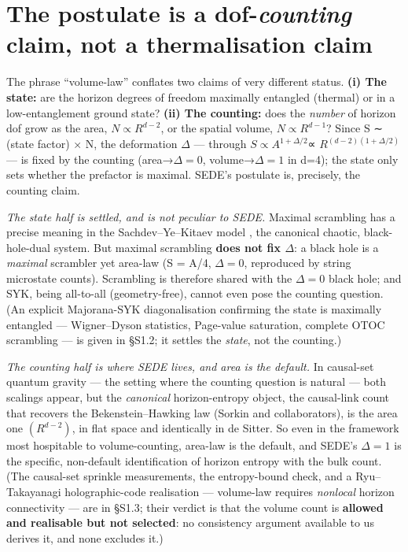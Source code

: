\documentclass[11pt,a4paper]{article}
\begin{document}
\section{\texorpdfstring{The postulate is a dof-\emph{counting} claim,
not a thermalisation
claim}{The postulate is a dof-counting claim, not a thermalisation claim}}\label{sec-2}

The phrase ``volume-law'' conflates two claims of very different status.
\textbf{(i) The state:} are the horizon degrees of freedom maximally
entangled (thermal) or in a low-entanglement ground state? \textbf{(ii)
The counting:} does the \emph{number} of horizon dof grow as the area,
\(N \propto  R^{d-2}\), or the spatial volume, \(N \propto  R^{d-1}\)?
Since S ∼ (state factor) × N, the deformation \(\Delta\) --- through
\(S \propto  A^{1+\Delta /2}\)∝ \(R^{(d-2)(1+\Delta /2)}\) --- is fixed
by the counting (area→\(\Delta =0\), volume→\(\Delta =1\) in d=4); the
state only sets whether the prefactor is maximal. SEDE's postulate is,
precisely, the counting claim.

\emph{The state half is settled, and is not peculiar to SEDE.} Maximal
scrambling has a precise meaning in the Sachdev--Ye--Kitaev model
\citep{Sachdev:1992fk, Kitaev:2015}, the canonical chaotic,
black-hole-dual system. But maximal scrambling \textbf{does not fix
\(\Delta\)}: a black hole is a \emph{maximal} scrambler yet area-law (S
= A/4, \(\Delta =0\), reproduced by string microstate counts).
Scrambling is therefore shared with the \(\Delta =0\) black hole; and
SYK, being all-to-all (geometry-free), cannot even pose the counting
question. (An explicit Majorana-SYK diagonalisation confirming the state
is maximally entangled --- Wigner--Dyson statistics, Page-value
saturation, complete OTOC scrambling --- is given in §S1.2; it settles
the \emph{state}, not the counting.)

\emph{The counting half is where SEDE lives, and area is the default.}
In causal-set quantum gravity --- the setting where the counting
question is natural --- both scalings appear, but the \emph{canonical}
horizon-entropy object, the causal-link count that recovers the
Bekenstein--Hawking law (Sorkin and collaborators), is the area one
\((R^{d-2})\), in flat space and identically in de Sitter. So even in
the framework most hospitable to volume-counting, area-law is the
default, and SEDE's \(\Delta =1\) is the specific, non-default
identification of horizon entropy with the bulk count. (The causal-set
sprinkle measurements, the entropy-bound check, and a Ryu--Takayanagi
holographic-code realisation --- volume-law requires \emph{nonlocal}
horizon connectivity --- are in §S1.3; their verdict is that the volume
count is \textbf{allowed and realisable but not selected}: no
consistency argument available to us derives it, and none excludes it.)
\end{document}
